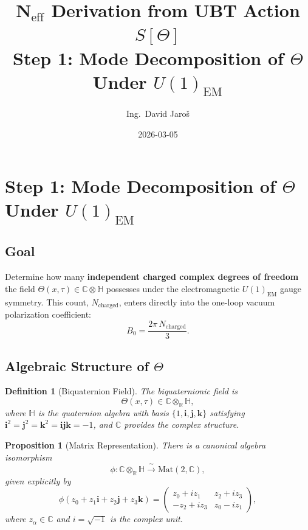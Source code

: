 \documentclass[11pt,a4paper]{article}
\title{N$_{\mathrm{eff}}$ Derivation from UBT Action $S[\Theta]$\\
    \large Step 1: Mode Decomposition of $\Theta$ Under $U(1)_{\mathrm{EM}}$}
\author{Ing.\ David Jaroš}
\date{2026-03-05}
\newcommand{\C}{\mathbb{C}}
\newcommand{\R}{\mathbb{R}}
\renewcommand{\H}{\mathbb{H}}
\newtheorem{proposition}[theorem]{Proposition}
\newtheorem{definition}[theorem]{Definition}
\theoremstyle{remark}
\begin{document}
  \maketitle
\fi

\section{Step 1: Mode Decomposition of $\Theta$ Under $U(1)_{\mathrm{EM}}$}
\label{sec:step1_mode_decomposition}

\subsection{Goal}

Determine how many \textbf{independent charged complex degrees of freedom} the field
$\Theta(x,\tau) \in \C \otimes \H$ possesses under the electromagnetic $U(1)_{\mathrm{EM}}$
gauge symmetry. This count, $N_{\mathrm{charged}}$, enters directly into the one-loop
vacuum polarization coefficient:
\begin{equation}
  B_0 = \frac{2\pi\,N_{\mathrm{charged}}}{3}.
  \label{eq:B0_formula}
\end{equation}

\subsection{Algebraic Structure of $\Theta$}

\begin{definition}[Biquaternion Field]
The biquaternionic field is
\begin{equation}
  \Theta(x,\tau) \in \C \otimes_{\R} \H,
  \label{eq:Theta_def}
\end{equation}
where $\H$ is the quaternion algebra with basis $\{1, \mathbf{i}, \mathbf{j}, \mathbf{k}\}$
satisfying $\mathbf{i}^2 = \mathbf{j}^2 = \mathbf{k}^2 = \mathbf{i}\mathbf{j}\mathbf{k} = -1$,
and $\C$ provides the complex structure.
\end{definition}

\begin{proposition}[Matrix Representation]
There is a canonical algebra isomorphism
\begin{equation}
  \phi: \C \otimes_{\R} \H \xrightarrow{\;\sim\;} \mathrm{Mat}(2,\C),
  \label{eq:CxH_isom}
\end{equation}
given explicitly by
\begin{equation}
  \phi(z_0 + z_1\mathbf{i} + z_2\mathbf{j} + z_3\mathbf{k})
  = \begin{pmatrix} z_0 + iz_1 & z_2 + iz_3 \\ -z_2 + iz_3 & z_0 - iz_1 \end{pmatrix},
  \label{eq:phi_explicit}
\end{equation}
where $z_\alpha \in \C$ and $i = \sqrt{-1}$ is the complex unit.
\end{proposition}
\end{document}

